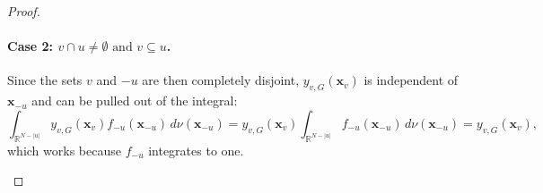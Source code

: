\begin{proof}
\begin{center}
\end{center}

\paragraph{Case 2: $v \cap u \ne \emptyset \text{ and } v \subseteq u$.}
Since the sets $v$ and $-u$ are then completely disjoint, $y_{v,G}(\boldsymbol{x}_v)$ is independent of $\boldsymbol{x}_{-u}$ and can be pulled out of the integral:
\[
\int_{\mathbb{R}^{N - |u|}} y_{v,G}(\boldsymbol{x}_v) f_{-u}(\boldsymbol{x}_{-u}) \, d \nu(\boldsymbol{x}_{-u})
= y_{v,G}(\boldsymbol{x}_v) \int_{\mathbb{R}^{N - |u|}} f_{-u}(\boldsymbol{x}_{-u}) \, d \nu(\boldsymbol{x}_{-u})
= y_{v,G}(\boldsymbol{x}_v),
\]
which works because $f_{-u}$ integrates to one.

\begin{center}
\end{center}


\end{proof}
